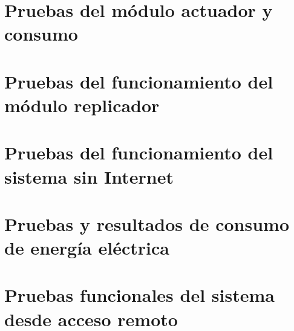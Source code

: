 \section{Pruebas del módulo actuador y consumo}
\section{Pruebas del funcionamiento del módulo replicador}
\section{Pruebas del funcionamiento del sistema sin Internet}
\section{Pruebas y resultados de consumo de energía eléctrica}
\section{Pruebas funcionales del sistema desde acceso remoto}
